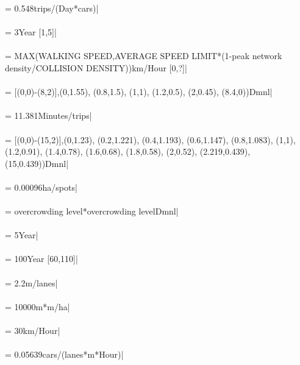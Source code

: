  = {\small 0.548trips/(Day*cars)|} \\ \\ 
 = {\small 3Year [1,5]|} \\ \\ 
 = {\small MAX(WALKING SPEED,AVERAGE SPEED LIMIT*(1-peak network density/COLLISION DENSITY))km/Hour [0,?]|} \\ \\ 
 = {\small [(0,0)-(8,2)],(0,1.55), (0.8,1.5), (1,1), (1.2,0.5), (2,0.45), (8.4,0))Dmnl|} \\ \\ 
 = {\small 11.381Minutes/trips|} \\ \\ 
 = {\small [(0,0)-(15,2)],(0,1.23), (0.2,1.221), (0.4,1.193), (0.6,1.147), (0.8,1.083), (1,1), (1.2,0.91), (1.4,0.78), (1.6,0.68), (1.8,0.58), (2,0.52), (2.219,0.439), (15,0.439))Dmnl|} \\ \\ 
 = {\small 0.00096ha/spots|} \\ \\ 
 = {\small overcrowding level*overcrowding levelDmnl|} \\ \\ 
 = {\small 5Year|} \\ \\ 
 = {\small 100Year [60,110]|} \\ \\ 
 = {\small 2.2m/lanes|} \\ \\ 
 = {\small 10000m*m/ha|} \\ \\ 
 = {\small 30km/Hour|} \\ \\ 
 = {\small 0.05639cars/(lanes*m*Hour)|} \\ \\ 
